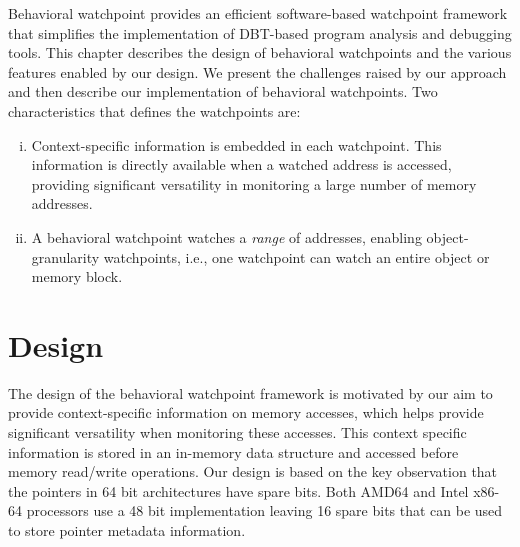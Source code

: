 Behavioral watchpoint provides an efficient software-based watchpoint framework that simplifies the implementation of DBT-based program analysis and debugging tools. This chapter describes the design of behavioral watchpoints and the various features enabled by our design. We present the challenges raised by our approach and then describe our implementation of behavioral watchpoints. 
Two characteristics that defines the watchpoints are:
\begin{enumerate}[i)]
	\item Context-specific information is embedded in each watchpoint. This information is directly available when a watched address is accessed, providing significant versatility in monitoring a large number of memory addresses.
	\item A behavioral watchpoint watches a \emph{range} of addresses, enabling object-granularity watchpoints, i.e., one watchpoint can watch an entire object or memory block.
\end{enumerate}




\section{Design}\label{sec:design}
The design of the behavioral watchpoint framework is motivated by our aim to provide context-specific information on memory accesses, which helps provide significant versatility when monitoring these accesses. This context specific information is stored in an in-memory data structure and accessed before memory read/write operations. %
%
%
Our design is based on the key observation that the pointers in 64 bit architectures have spare bits. Both AMD64 and Intel x86-64 processors use a 48 bit implementation leaving 16 spare bits that can be used to store pointer metadata information. 

